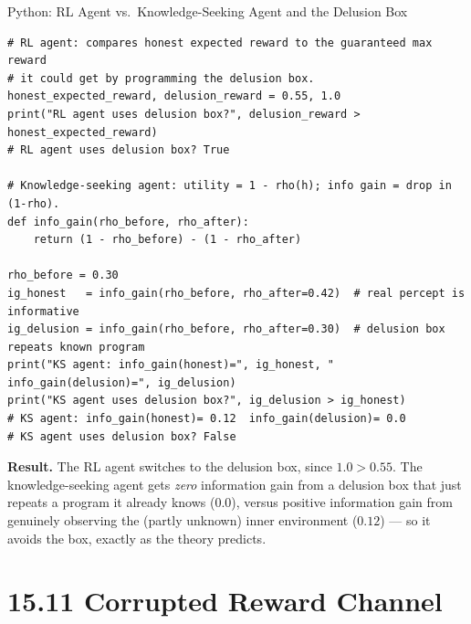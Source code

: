 \documentclass[aspectratio=169,10pt]{beamer}
\begin{document}
\begin{frame}[fragile]{Python: RL Agent vs.\ Knowledge-Seeking Agent and the Delusion Box}
  \begin{lstlisting}
# RL agent: compares honest expected reward to the guaranteed max reward
# it could get by programming the delusion box.
honest_expected_reward, delusion_reward = 0.55, 1.0
print("RL agent uses delusion box?", delusion_reward > honest_expected_reward)
# RL agent uses delusion box? True

# Knowledge-seeking agent: utility = 1 - rho(h); info gain = drop in (1-rho).
def info_gain(rho_before, rho_after):
    return (1 - rho_before) - (1 - rho_after)

rho_before = 0.30
ig_honest   = info_gain(rho_before, rho_after=0.42)  # real percept is informative
ig_delusion = info_gain(rho_before, rho_after=0.30)  # delusion box repeats known program
print("KS agent: info_gain(honest)=", ig_honest, " info_gain(delusion)=", ig_delusion)
print("KS agent uses delusion box?", ig_delusion > ig_honest)
# KS agent: info_gain(honest)= 0.12  info_gain(delusion)= 0.0
# KS agent uses delusion box? False
  \end{lstlisting}
  \textbf{Result.} The RL agent switches to the delusion box, since
  $1.0>0.55$. The knowledge-seeking agent gets \emph{zero} information
  gain from a delusion box that just repeats a program it already knows
  ($0.0$), versus positive information gain from genuinely observing the
  (partly unknown) inner environment ($0.12$) --- so it avoids the box,
  exactly as the theory predicts.
\end{frame}

\section{15.11 Corrupted Reward Channel}
\end{document}
